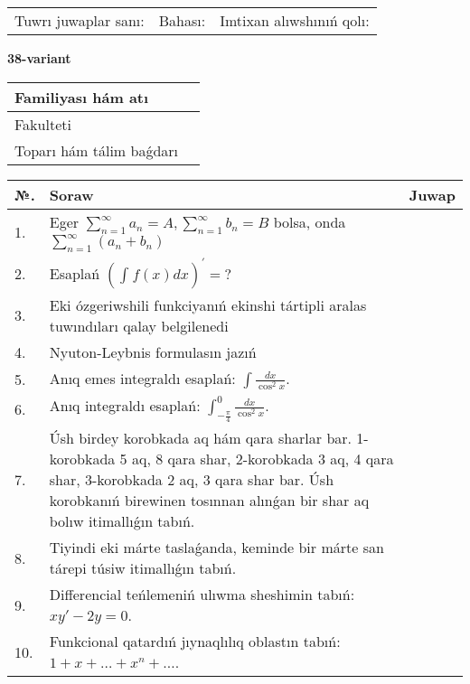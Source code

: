 \documentclass{article}
\begin{document}
\vspace{1cm}

\begin{tabular}{ c c c }
Tuwrı juwaplar sanı: \underline{\hspace{2cm}} & Bahası: \underline{\hspace{2cm}} & Imtixan alıwshınıń qolı: \underline{\hspace{2cm}} \\
\end{tabular}

\newpage

\begin{center}\textbf{38-variant}\end{center}

\bgroup
\def\arraystretch{1.5}
\begin{tabular}{ |m{6cm}|m{10cm}| }
  \hline
  Familiyası hám atı & \\
  \hline
  Fakulteti &\\
  \hline
  Toparı hám tálim baǵdarı & \\
  \hline
\end{tabular}
\egroup

\vspace{0.5cm}

\bgroup
\def\arraystretch{2}
\begin{tabular}{ |l|m{8cm}|m{7cm}| }
  \hline
  №. & Soraw & Juwap \\
  \hline
  1. & Eger $\displaystyle\sum_{n = 1}^{\infty}a_{n} = A, \sum_{n = 1}^{\infty}b_{n} = B$ bolsa, onda $\displaystyle\sum_{n = 1}^{\infty}\left( a_{n} + b_{n} \right)$ &  \\
  \hline
  2. & Esaplań $\displaystyle \left( \int_{}^{}{f(x)dx} \right)^\prime = ?$ &  \\
  \hline
  3. & Eki ózgeriwshili funkciyanıń ekinshi tártipli aralas tuwındıları qalay belgilenedi &  \\
  \hline
  4. & Nyuton-Leybnis formulasın jazıń &  \\
  \hline
  5. & Anıq emes integraldı esaplań: $\displaystyle\int \frac{dx}{\cos^{2}x}$. &  \\
  \hline
  6. & Anıq integraldı esaplań: $\displaystyle\int_{-\frac{\pi}{4}}^{0}\frac{dx}{\cos^{2}x}$. &  \\
  \hline
  7. & Úsh birdey korobkada aq hám qara sharlar bar. 1-korobkada 5 aq, 8 qara shar, 2-korobkada 3 aq, 4 qara shar, 3-korobkada 2 aq, 3 qara shar bar. Úsh korobkanıń birewinen tosınnan alınǵan bir shar aq bolıw itimallıǵın tabıń. &  \\
  \hline
  8. & Tiyindi eki márte taslaǵanda, keminde bir márte san tárepi túsiw itimallıǵın tabıń. &  \\
  \hline
  9. & Differencial teńlemeniń ulıwma sheshimin tabıń: $xy' - 2y = 0$. &  \\
  \hline
  10. & Funkcional qatardıń jıynaqlılıq oblastın tabıń: $1 + x + \ldots + x^{n} + \ldots$. &  \\
  \hline
\end{tabular}
\egroup
\end{document}
